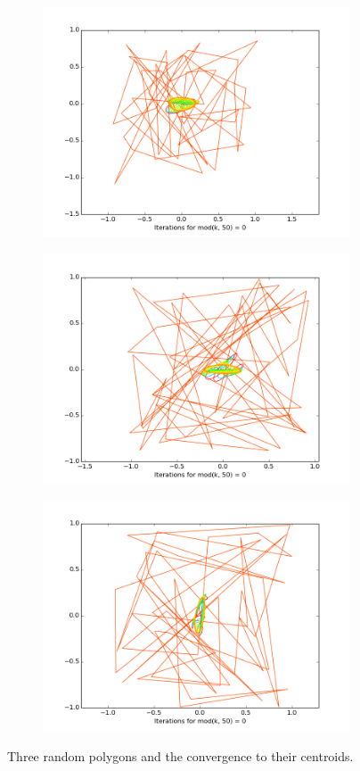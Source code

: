 \documentclass[12pt]{article}
\begin{document}
\begin{figure}[H]
\centering
\begin{subfigure}{.5\textwidth}
  \centering
\includegraphics[width = 0.95 \linewidth]{plot1.png}
\end{subfigure}%
\begin{subfigure}{.5\textwidth}
  \centering
\includegraphics[width = 0.95 \linewidth]{plot2.png}
\end{subfigure}
\label{fig:components}

\begin{subfigure}{.5\textwidth}
  \centering
\includegraphics[width = 0.95 \linewidth]{plot3.png}
\end{subfigure}
\caption{Three random polygons and the convergence to their centroids.}
\label{fig:output}
\end{figure}
\end{document}
